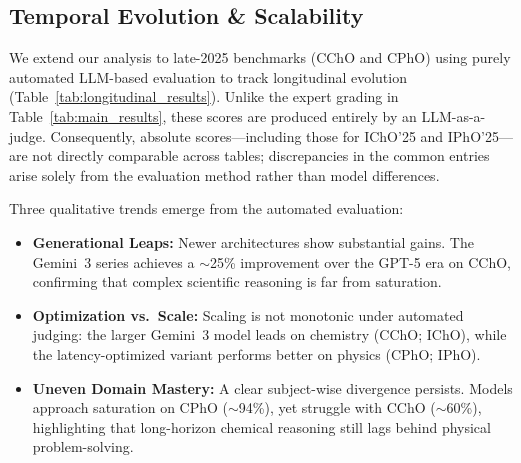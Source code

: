 \documentclass[11pt]{article}
\begin{document}
\subsection{Temporal Evolution \& Scalability}
We extend our analysis to late-2025 benchmarks (CChO and CPhO) using purely automated LLM-based evaluation to track longitudinal evolution (Table~\ref{tab:longitudinal_results}).
Unlike the expert grading in Table~\ref{tab:main_results}, these scores are produced entirely by an LLM-as-a-judge.
Consequently, absolute scores—including those for IChO'25 and IPhO'25—are not directly comparable across tables; discrepancies in the common entries arise solely from the evaluation method rather than model differences.

Three qualitative trends emerge from the automated evaluation:
\begin{itemize}[leftmargin=*, noitemsep, topsep=2pt]
    \item \textbf{Generational Leaps:} Newer architectures show substantial gains. The Gemini~3 series achieves a $\sim$25\% improvement over the GPT-5 era on CChO, confirming that complex scientific reasoning is far from saturation.
    \item \textbf{Optimization vs.\ Scale:} Scaling is not monotonic under automated judging: the larger Gemini~3 model leads on chemistry (CChO; IChO), while the latency-optimized variant performs better on physics (CPhO; IPhO).
    \item \textbf{Uneven Domain Mastery:} A clear subject-wise divergence persists. Models approach saturation on CPhO ($\sim$94\%), yet struggle with CChO ($\sim$60\%), highlighting that long-horizon chemical reasoning still lags behind physical problem-solving.
\end{itemize}
\end{document}
